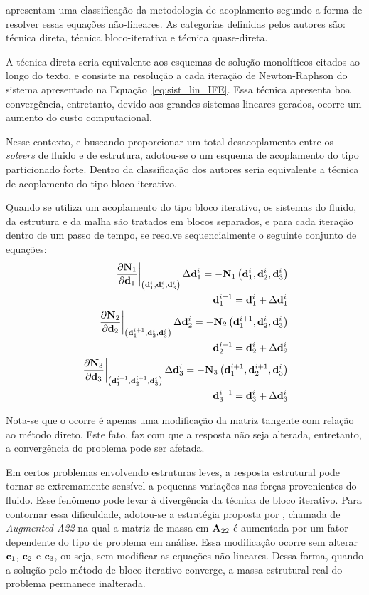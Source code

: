  apresentam uma classificação da metodologia de acoplamento segundo a forma de resolver essas equações não-lineares. As categorias definidas pelos autores são: técnica direta, técnica bloco-iterativa e técnica quase-direta. 

A técnica direta seria equivalente aos esquemas de solução monolíticos citados ao longo do texto, e consiste na resolução a cada iteração de Newton-Raphson do sistema apresentado na Equação~\eqref{eq:sist_lin_IFE}. Essa técnica apresenta boa convergência, entretanto, devido aos grandes sistemas lineares gerados, ocorre um aumento do custo computacional.

Nesse contexto, e buscando proporcionar um total desacoplamento entre os \textit{solvers} de fluido e de estrutura, adotou-se o um esquema de acoplamento do tipo particionado forte. Dentro da classificação dos autores  seria equivalente a técnica de acoplamento do tipo bloco iterativo.

Quando se utiliza um acoplamento do tipo bloco iterativo, os sistemas do fluido, da estrutura e da malha são tratados em blocos separados, e para cada iteração dentro de um passo de tempo, se resolve sequencialmente o seguinte conjunto de equações:
\begin{align}
	\left .\frac{\partial\mathbf{N}_{1}}{\partial\mathbf{d}_{1}}\right|_{\left(\mathbf{d}_{1}^{i},\mathbf{d}_{2}^{i},\mathbf{d}_{3}^{i}\right)} \Delta\mathbf{d}_{1}^{i} = - \mathbf{N}_{1}\left(\mathbf{d}_{1}^{i},\mathbf{d}_{2}^{i},\mathbf{d}_{3}^{i}\right)  \label{eq:lin_fluido} \\
	\mathbf{d}_{1}^{i+1} =  \mathbf{d}_{1}^{i} + \Delta\mathbf{d}_{1}^{i} \label{eq:atu_fluido}	\\
	\left.\frac{\partial\mathbf{N}_{2}}{\partial\mathbf{d}_{2}}\right|_{\left(\mathbf{d}_{1}^{i+1},\mathbf{d}_{2}^{i},\mathbf{d}_{3}^{i}\right)} \Delta\mathbf{d}_{2}^{i} = - \mathbf{N}_{2}\left(\mathbf{d}_{1}^{i+1},\mathbf{d}_{2}^{i},\mathbf{d}_{3}^{i}\right) \label{eq:lin_est}\\
	\mathbf{d}_{2}^{i+1} =  \mathbf{d}_{2}^{i} + \Delta\mathbf{d}_{2}^{i} \label{eq:atu_est}\\
	\left.\frac{\partial\mathbf{N}_{3}}{\partial\mathbf{d}_{3}}\right|_{\left(\mathbf{d}_{1}^{i+1},\mathbf{d}_{2}^{i+1},\mathbf{d}_{3}^{i}\right)} \Delta\mathbf{d}_{3}^{i} = - \mathbf{N}_{3}\left(\mathbf{d}_{1}^{i+1},\mathbf{d}_{2}^{i+1},\mathbf{d}_{3}^{i}\right) \label{eq:lin_malha}\\
	\mathbf{d}_{3}^{i+1} =  \mathbf{d}_{3}^{i} + \Delta\mathbf{d}_{3}^{i}  \label{eq:atu_malha}
\end{align}

Nota-se que o ocorre é apenas uma modificação da matriz tangente com relação ao método direto. Este fato, faz com que a resposta não seja alterada, entretanto, a convergência do problema pode ser afetada. 

Em certos problemas envolvendo estruturas leves, a resposta estrutural pode tornar-se extremamente sensível a pequenas variações nas forças provenientes do fluido. Esse fenômeno pode levar à divergência da técnica de bloco iterativo. Para contornar essa dificuldade, adotou-se a estratégia proposta por , chamada de \textit{Augmented A22} na qual a matriz de massa em $\mathbf{A}_{22}$ é aumentada por um fator dependente do tipo de problema em análise. Essa modificação ocorre sem alterar $\mathbf{c}_{1}$, $\mathbf{c}_{2}$ e $\mathbf{c}_{3}$, ou seja, sem modificar as equações não-lineares. Dessa forma, quando a solução pelo método de bloco iterativo converge, a massa estrutural real do problema permanece inalterada.

